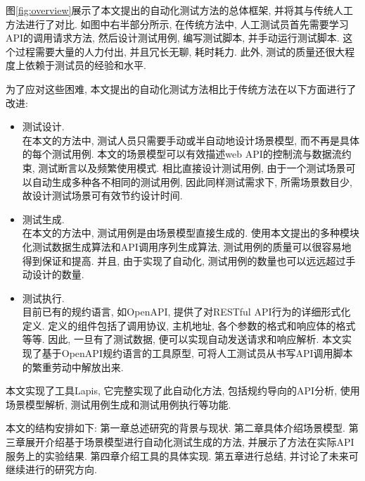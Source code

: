         图\ref{fig:overview}展示了本文提出的自动化测试方法的总体框架, 并将其与传统人工方法进行了对比. 如图中右半部分所示, 在传统方法中, 人工测试员首先需要学习API的调用请求方法, 然后设计测试用例, 编写测试脚本, 并手动运行测试脚本. 这个过程需要大量的人力付出, 并且冗长无聊, 耗时耗力. 此外, 测试的质量还很大程度上依赖于测试员的经验和水平.
        
        为了应对这些困难, 本文提出的自动化测试方法相比于传统方法在以下方面进行了改进:
        \begin{itemize}
            \item 测试设计. \\
                在本文的方法中, 测试人员只需要手动或半自动地设计场景模型, 而不再是具体的每个测试用例. 本文的场景模型可以有效描述web API的控制流与数据流约束, 测试断言以及频繁使用模式. 相比直接设计测试用例, 由于一个测试场景可以自动生成多种各不相同的测试用例, 因此同样测试需求下, 所需场景数目少, 故设计测试场景可有效节约设计时间.
            
            \item 测试生成.\\
                在本文的方法中, 测试用例是由场景模型直接生成的. 使用本文提出的多种模块化测试数据生成算法和API调用序列生成算法, 测试用例的质量可以很容易地得到保证和提高. 并且, 由于实现了自动化, 测试用例的数量也可以远远超过手动设计的数量.
            
            \item 测试执行.\\
                目前已有的规约语言, 如OpenAPI, 提供了对RESTful API行为的详细形式化定义. 定义的组件包括了调用协议, 主机地址, 各个参数的格式和响应体的格式等等. 因此, 一旦有了测试数据, 便可以实现自动发送请求和响应解析.  本文实现了基于OpenAPI规约语言的工具原型, 可将人工测试员从书写API调用脚本的繁重劳动中解放出来.
        \end{itemize}
        
        本文实现了工具Lapis, 它完整实现了此自动化方法, 包括规约导向的API分析, 使用场景模型解析, 测试用例生成和测试用例执行等功能.
        
        本文的结构安排如下: 第一章总述研究的背景与现状. 第二章具体介绍场景模型. 第三章展开介绍基于场景模型进行自动化测试生成的方法, 并展示了方法在实际API服务上的实验结果. 第四章介绍工具的具体实现. 第五章进行总结, 并讨论了未来可继续进行的研究方向.
        
        

